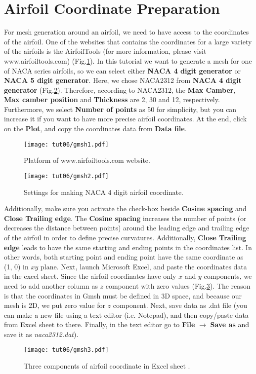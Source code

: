 \section{Airfoil Coordinate Preparation}
For mesh generation around an airfoil, we need to have access to the coordinates of the airfoil. One of the websites that contains the coordinates for a large variety of the airfoils is the AirfoilTools (for more information, please visit www.airfoiltools.com) (Fig.\ref{fig6:gmsh1}). In this tutorial we want to generate a mesh for one of NACA series airfoils, so we can select either \textbf{NACA 4 digit generator} or \textbf{NACA 5 digit generator}. Here, we chose NACA2312 from \textbf{NACA 4 digit generator} (Fig.\ref{fig6:gmsh2}). Therefore, according to NACA2312, the \textbf{Max Camber}, \textbf{Max camber position} and \textbf{Thickness} are 2, 30 and 12, respectively. Furthermore, we select \textbf{Number of points} as 50 for simplicity, but you can increase it if you want to have more precise airfoil coordinates. At the end, click on the \textbf{Plot}, and copy the coordinates data from \textbf{Data file}.
\begin{figure}[htbp]
    \centering
    \texttt{[image: tut06/gmsh1.pdf]}
    \caption{Platform of www.airfoiltools.com website.}
    \label{fig6:gmsh1}
\end{figure}
\begin{figure}[htbp]
    \centering
    \texttt{[image: tut06/gmsh2.pdf]}
    \caption{Settings for making NACA 4 digit airfoil coordinate.}
    \label{fig6:gmsh2}
\end{figure}
Additionally, make sure you activate the check-box beside \textbf{Cosine spacing} and \textbf{Close Trailing edge}. The \textbf{Cosine spacing} increases the number of points (or decreases the distance between points) around the leading edge and trailing edge of the airfoil in order to define precise curvatures. Additionally, \textbf{Close Trailing edge} leads to have the same starting and ending points in the coordinates list. In other words, both starting point and ending point have the same coordinate as (1, 0) in $xy$ plane. 
Next, launch Microsoft Excel, and paste the coordinates data in the excel sheet. Since the airfoil coordinates have only $x$ and $y$ components, we need to add another column as $z$ component with zero values (Fig.\ref{fig6:gmsh3}). The reason is that the coordinates in Gmsh must be defined in 3D space, and because our mesh is 2D, we put zero value for $z$ component. Next, save data as .dat file (you can make a new file using a text editor (i.e. Notepad), and then copy/paste data from Excel sheet to there. Finally, in the text editor go to \textbf{File} $\rightarrow$ \textbf{Save as} and save it as \textit{naca2312.dat}).
\begin{figure}[htbp]
    \centering
    \texttt{[image: tut06/gmsh3.pdf]}
    \caption{Three components of airfoil coordinate in Excel sheet .}
    \label{fig6:gmsh3}
\end{figure}
